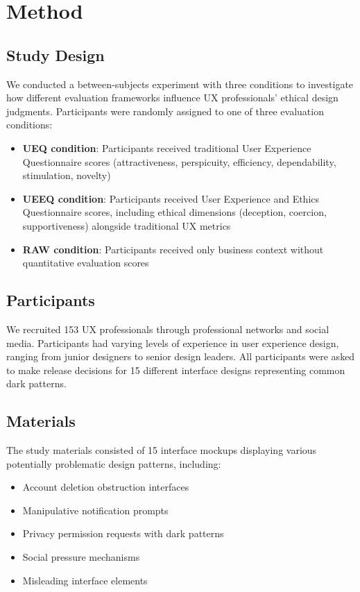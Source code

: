 
\section{Method}

\subsection{Study Design}
We conducted a between-subjects experiment with three conditions to investigate how different evaluation frameworks influence UX professionals' ethical design judgments. Participants were randomly assigned to one of three evaluation conditions:

\begin{itemize}
\item \textbf{UEQ condition}: Participants received traditional User Experience Questionnaire scores (attractiveness, perspicuity, efficiency, dependability, stimulation, novelty)
\item \textbf{UEEQ condition}: Participants received User Experience and Ethics Questionnaire scores, including ethical dimensions (deception, coercion, supportiveness) alongside traditional UX metrics
\item \textbf{RAW condition}: Participants received only business context without quantitative evaluation scores
\end{itemize}

\subsection{Participants}
We recruited 153 UX professionals through professional networks and social media. Participants had varying levels of experience in user experience design, ranging from junior designers to senior design leaders. All participants were asked to make release decisions for 15 different interface designs representing common dark patterns.

\subsection{Materials}
The study materials consisted of 15 interface mockups displaying various potentially problematic design patterns, including:
\begin{itemize}
\item Account deletion obstruction interfaces
\item Manipulative notification prompts  
\item Privacy permission requests with dark patterns
\item Social pressure mechanisms
\item Misleading interface elements
\end{itemize}

